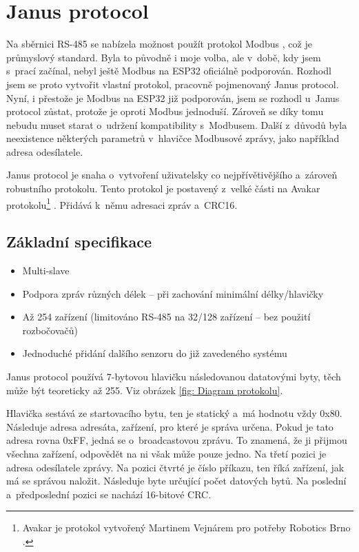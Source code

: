 \chapter{Janus protocol} \label{Protocol}
Na sběrnici RS-485 se nabízela možnost použít protokol Modbus \cite{modbus}, což je průmyslový standard.
Byla to původně i moje volba, ale v~době, kdy jsem s~prací začínal, nebyl ještě Modbus na ESP32 oficiálně podporován.
Rozhodl jsem se proto vytvořit vlastní protokol, pracovně pojmenovaný Janus protocol.
Nyní, i přestože je Modbus na ESP32 již podporován, jsem se rozhodl u~Janus protocol zůstat, protože je oproti Modbus jednoduší.
Zároveň se díky tomu nebudu muset starat o~udržení kompatibility s~Modbusem.
Další z~důvodů byla neexistence některých parametrů v~hlavičce Modbusové zprávy, jako například adresa odesílatele. 

Janus protocol je snaha o~vytvoření uživatelsky co nejpřívětivějšího a~zároveň robustního protokolu.
Tento protokol je postavený z~velké části na Avakar protokolu\footnote{Avakar je protokol vytvořený Martinem Vejnárem pro potřeby Robotics Brno \cite{robotikabrno}.} \cite{avakar}.
Přidává k~němu adresaci zpráv a~CRC16.


\section{Základní specifikace}
\begin{itemize}
    \item Multi-slave
    \item Podpora zpráv různých délek -- při zachování minimální délky/hlavičky
    \item Až 254 zařízení (limitováno RS-485 na 32/128 zařízení -- bez použití rozbočovačů)
    \item Jednoduché přidání dalšího senzoru do již zavedeného systému
\end{itemize}

Janus protocol používá 7-bytovou hlavičku následovanou datatovými byty, těch může být teoreticky až 255.
Viz obrázek \ref{fig: Diagram protokolu}.

Hlavička sestává ze startovacího bytu, ten je statický a~má hodnotu vždy 0x80.
Následuje adresa adresáta, zařízení, pro které je správa určena.
Pokud je tato adresa rovna 0xFF, jedná se o~broadcastovou zprávu. To znamená, že ji přijmou všechna zařízení, odpovědět na ni však může pouze jedno.
Na třetí pozici je adresa odesílatele zprávy.
Na pozici čtvrté je číslo příkazu, ten říká zařízení, jak má se správou naložit.
Následuje byte určující počet datových bytů.
Na poslední a~předposlední pozici se nachází 16-bitové CRC.

